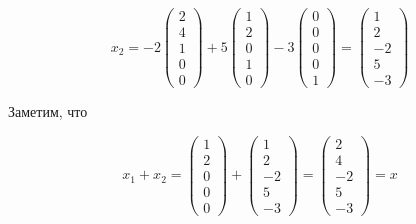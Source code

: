 \documentclass[12pt, a4paper]{article}
\begin{document}
    \begin{equation}
        x_2 = -2 \left(\begin{matrix}
            2 \\
            4 \\
            1 \\
            0 \\
            0
        \end{matrix}\right) + 5 \left(\begin{matrix}
            1 \\
            2 \\
            0 \\
            1 \\
            0
        \end{matrix}\right) - 3 \begin{pmatrix}
            0 \\ 0\\0\\0\\1
        \end{pmatrix} = \begin{pmatrix}
            1 \\ 2 \\ -2 \\ 5 \\ -3
        \end{pmatrix}
    \end{equation}

    Заметим, что 

    \begin{equation}
        x_1 + x_2 = \left(\begin{matrix}
            1 \\
            2 \\
            0 \\
            0 \\
            0
        \end{matrix}\right) + \begin{pmatrix}
            1 \\ 2 \\ -2 \\ 5 \\ -3
        \end{pmatrix} = \left(\begin{matrix}
            2 \\
            4 \\
            -2 \\
            5 \\
            -3
        \end{matrix}\right) = x 
    \end{equation}
\end{document}
